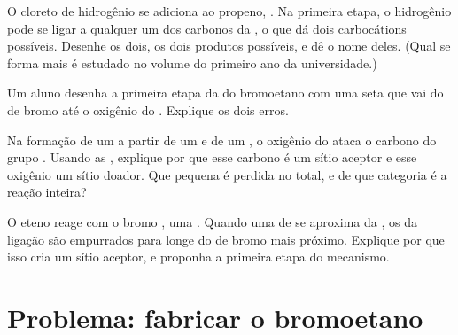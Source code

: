 \begin{exercise}[$\star\star\star$]\label{exo:g12:curly-arrows:12}
O cloreto de hidrogênio se adiciona ao propeno, . Na
primeira etapa, o  hidrogênio pode se ligar a qualquer um dos
carbonos da , o que dá dois carbocátions possíveis. Desenhe
os dois, os dois produtos possíveis, e dê o nome deles. (Qual se forma
mais é estudado no volume do primeiro ano da universidade.)
\end{exercise}

\begin{exercise}[$\star\star\star$]\label{exo:g12:curly-arrows:13}
Um aluno desenha a primeira etapa da  do bromoetano com uma
seta que vai do  de bromo até o oxigênio do . Explique os
dois erros.
\end{exercise}

\begin{exercise}[$\star\star\star$]\label{exo:g12:curly-arrows:14}
Na formação de um  a partir de um  e de um ,
o oxigênio do  ataca o carbono do grupo . Usando as , explique por que esse carbono é um sítio aceptor e esse
oxigênio um sítio doador. Que  pequena é perdida no total, e de
que categoria é a reação inteira?
\end{exercise}

\begin{exercise}[$\star\star\star$]\label{exo:g12:curly-arrows:15}
O eteno reage com o bromo , uma . Quando uma
 de  se aproxima da , os  da
ligação  são empurrados para longe do  de bromo mais
próximo. Explique por que isso cria um sítio aceptor, e proponha a
primeira etapa do mecanismo.
\end{exercise}

\section{Problema: fabricar o bromoetano}

